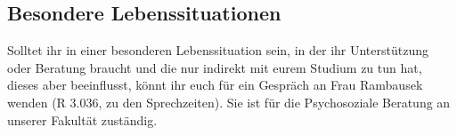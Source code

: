 \subsection{Besondere Lebenssituationen}
Solltet ihr in einer besonderen Lebenssituation sein, in der ihr 
Unterstützung oder Beratung braucht und die nur indirekt mit eurem 
Studium zu tun hat, dieses aber beeinflusst, könnt ihr euch für ein 
Gespräch an Frau Rambausek wenden (R 3.036, zu den Sprechzeiten). 
Sie ist für die Psychosoziale Beratung an unserer Fakultät zuständig.
